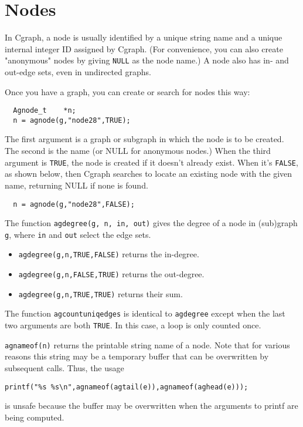 \documentclass[11pt,letterpaper]{article}
\begin{document}
\section{Nodes}
\label{sec:nodes}
In Cgraph, a node is usually identified by a unique string name
and a unique internal integer ID assigned by Cgraph.
(For convenience, you can also create "anonymous" nodes by
giving \verb"NULL" as the node name.) A node also has in- and out-edge sets,
even in undirected graphs.

Once you have a graph, you can create or search for nodes this way:
\begin{verbatim}
  Agnode_t    *n;
  n = agnode(g,"node28",TRUE);
\end{verbatim}

The first argument is a graph or subgraph in which the node
is to be created.  The second is the name (or NULL for anonymous nodes.)
When the third argument is \verb"TRUE", the node is created if it doesn't
already exist.  When it's \verb"FALSE", as shown below, then Cgraph 
searches to locate an existing node with the given name, returning NULL if
none is found.

\begin{verbatim}
  n = agnode(g,"node28",FALSE);
\end{verbatim}

The function \verb"agdegree(g, n, in, out)" gives the degree
of a node in (sub)graph \verb"g", where \verb"in" and \verb"out" select the edge sets.
\begin{itemize}
\item \verb"agdegree(g,n,TRUE,FALSE)" returns the in-degree.
\item \verb"agdegree(g,n,FALSE,TRUE)" returns the out-degree.
\item \verb"agdegree(g,n,TRUE,TRUE)" returns their sum.
\end{itemize}
The function \verb"agcountuniqedges" is identical to {\tt agdegree}
except when the last two arguments are both \verb"TRUE". In this case, a loop is only
counted once.

\verb"agnameof(n)" returns the printable string name of a node.
Note that for various reasons this string may be a temporary
buffer that can be overwritten by subsequent calls.
Thus, the usage
\begin{verbatim}
printf("%s %s\n",agnameof(agtail(e)),agnameof(aghead(e)));
\end{verbatim}
is unsafe because the buffer may be overwritten when the
arguments to printf are being computed.
\end{document}
